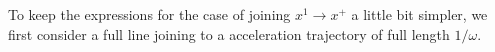 \documentclass[a4paper]{article}
\theoremstyle{definition}
\theoremstyle{plain}
\newtheorem{lemma}{Lemma}
\begin{document}

To keep the expressions for the case of joining $x^{1} \rightarrow x^{+}$ a
little bit simpler, we first consider a full line joining to a acceleration
trajectory of full length $1/\omega$.
\end{document}
